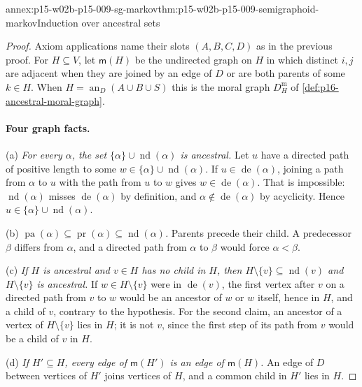 \begin{annexitem}{annex:p15-w02b-p15-009-sg-markov}{thm:p15-w02b-p15-009-semigraphoid-markov}{Induction over ancestral sets}
\begin{proof}
Axiom applications name their slots \((A,B,C,D)\) as in the previous
proof. For \(H\subseteq V\), let \(\mathsf m(H)\) be the undirected
graph on \(H\) in which distinct \(i,j\) are adjacent when they are
joined by an edge of \(D\) or are both parents of some \(k\in H\).
When \(H=\operatorname{an}_D(A\cup B\cup S)\) this is the moral graph
\(D_H^{\mathrm m}\) of \cref{def:p16-ancestral-moral-graph}.

\paragraph{Four graph facts.}
(a) \emph{For every \(\alpha\), the set \(\{\alpha\}\cup\operatorname{nd}(\alpha)\)
is ancestral.} Let \(u\) have a directed path of positive length to
some \(w\in\{\alpha\}\cup\operatorname{nd}(\alpha)\). If
\(u\in\operatorname{de}(\alpha)\), joining a path from \(\alpha\) to
\(u\) with the path from \(u\) to \(w\) gives \(w\in\operatorname{de}(\alpha)\).
That is impossible: \(\operatorname{nd}(\alpha)\) misses
\(\operatorname{de}(\alpha)\) by definition, and
\(\alpha\notin\operatorname{de}(\alpha)\) by acyclicity. Hence
\(u\in\{\alpha\}\cup\operatorname{nd}(\alpha)\).

(b) \emph{\(\operatorname{pa}(\alpha)\subseteq\operatorname{pr}(\alpha)
\subseteq\operatorname{nd}(\alpha)\).} Parents precede their child.
A predecessor \(\beta\) differs from \(\alpha\), and a directed path
from \(\alpha\) to \(\beta\) would force \(\alpha<\beta\).

(c) \emph{If \(H\) is ancestral and \(v\in H\) has no child in \(H\),
then \(H\setminus\{v\}\subseteq\operatorname{nd}(v)\) and
\(H\setminus\{v\}\) is ancestral.} If \(w\in H\setminus\{v\}\) were in
\(\operatorname{de}(v)\), the first vertex after \(v\) on a directed
path from \(v\) to \(w\) would be an ancestor of \(w\) or \(w\) itself,
hence in \(H\), and a child of \(v\), contrary to the hypothesis. For the second claim, an ancestor
of a vertex of \(H\setminus\{v\}\) lies in \(H\); it is not \(v\),
since the first step of its path from \(v\) would be a child of \(v\)
in \(H\).

(d) \emph{If \(H'\subseteq H\), every edge of \(\mathsf m(H')\) is an
edge of \(\mathsf m(H)\).} An edge of \(D\) between vertices of \(H'\)
joins vertices of \(H\), and a common child in \(H'\) lies in \(H\).


\end{proof}
\end{annexitem}

